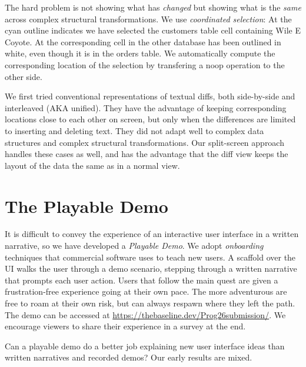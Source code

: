 \documentclass[english,submission]{programming}
\theoremstyle{definition}
\newcommand{\circledtext}[1]{{\sffamily\Circled{#1}}} %
\begin{document}
The hard problem is not showing what has \textit{changed} but showing what is the \textit{same} across complex structural transformations.
We use \textit{coordinated selection}:  At \circledtext{1} the cyan outline indicates we have selected the \textsf{customers} table cell containing \textsf{Wile E Coyote}. At \circledtext{2} the corresponding cell in the other database has been outlined in white, even though it is in the \textsf{orders} table. We automatically compute the corresponding location of the selection by transfering a \textsf{noop} operation to the other side.

We first tried conventional representations of textual diffs, both side-by-side and interleaved (AKA unified). They have the advantage of keeping corresponding locations close to each other on screen, but only when the differences are limited to inserting and deleting text. They did not adapt well to complex data structures and complex structural transformations. Our split-screen approach handles these cases as well, and has the advantage that the diff view keeps the layout of the data the same as in a normal view.



\section{The Playable Demo}\label{demo}

It is difficult to convey the experience of an interactive user interface in a written narrative, so we have developed a \textit{Playable Demo}. We adopt \textit{onboarding} techniques that commercial software uses to teach new users. A scaffold over the UI walks the user through a demo scenario, stepping through a written narrative that prompts each user action. Users that follow the main quest are given a frustration-free experience going at their own pace. The more adventurous are free to roam at their own risk, but can always respawn where they left the path. The demo can be accessed at \url{https://thebaseline.dev/Prog26submission/}. We encourage viewers to share their experience in a survey at the end.

Can a playable demo do a better job explaining new user interface ideas than
written narratives and recorded demos? Our early results are mixed.
\end{document}
